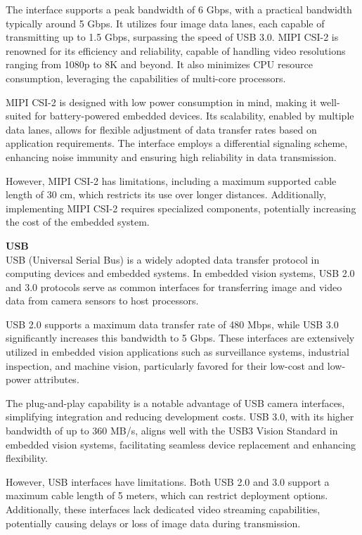 The interface supports a peak bandwidth of 6 Gbps, with a practical bandwidth typically around 5 Gbps. It utilizes four image data lanes, each capable of transmitting up to 1.5 Gbps, surpassing the speed of USB 3.0. MIPI CSI-2 is renowned for its efficiency and reliability, capable of handling video resolutions ranging from 1080p to 8K and beyond. It also minimizes CPU resource consumption, leveraging the capabilities of multi-core processors.

MIPI CSI-2 is designed with low power consumption in mind, making it well-suited for battery-powered embedded devices. Its scalability, enabled by multiple data lanes, allows for flexible adjustment of data transfer rates based on application requirements. The interface employs a differential signaling scheme, enhancing noise immunity and ensuring high reliability in data transmission.

However, MIPI CSI-2 has limitations, including a maximum supported cable length of 30 cm, which restricts its use over longer distances. Additionally, implementing MIPI CSI-2 requires specialized components, potentially increasing the cost of the embedded system.

\textbf{USB} \\
USB (Universal Serial Bus) is a widely adopted data transfer protocol in computing devices and embedded systems. In embedded vision systems, USB 2.0 and 3.0 protocols serve as common interfaces for transferring image and video data from camera sensors to host processors.

USB 2.0 supports a maximum data transfer rate of 480 Mbps, while USB 3.0 significantly increases this bandwidth to 5 Gbps. These interfaces are extensively utilized in embedded vision applications such as surveillance systems, industrial inspection, and machine vision, particularly favored for their low-cost and low-power attributes.

The plug-and-play capability is a notable advantage of USB camera interfaces, simplifying integration and reducing development costs. USB 3.0, with its higher bandwidth of up to 360 MB/s, aligns well with the USB3 Vision Standard in embedded vision systems, facilitating seamless device replacement and enhancing flexibility.

However, USB interfaces have limitations. Both USB 2.0 and 3.0 support a maximum cable length of 5 meters, which can restrict deployment options. Additionally, these interfaces lack dedicated video streaming capabilities, potentially causing delays or loss of image data during transmission.\\

